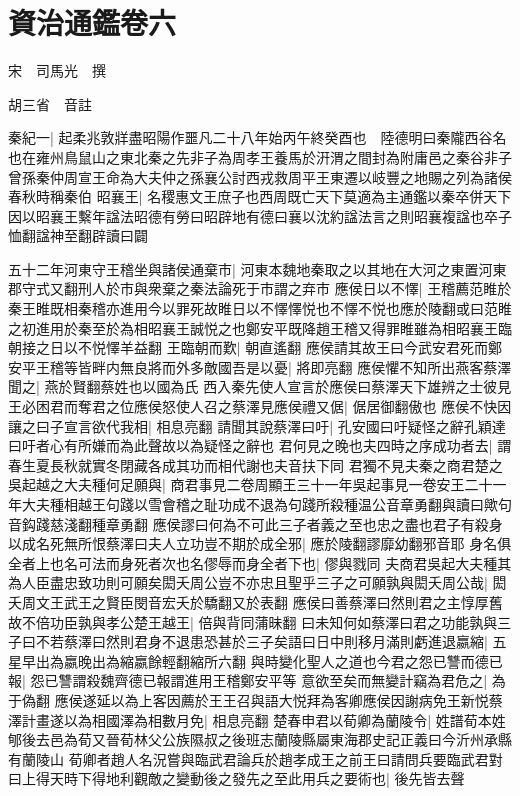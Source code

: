 \chapter{資治通鑑卷六}
宋　司馬光　撰

胡三省　音註

秦紀一|{
	起柔兆敦牂盡昭陽作噩凡二十八年始丙午終癸酉也　陸德明曰秦隴西谷名也在雍州鳥鼠山之東北秦之先非子為周孝王養馬於汧渭之間封為附庸邑之秦谷非子曾孫秦仲周宣王命為大夫仲之孫襄公討西戎救周平王東遷以岐豐之地賜之列為諸侯春秋時稱秦伯}
昭襄王|{
	名稷惠文王庶子也西周既亡天下莫適為主通鑑以秦卒併天下因以昭襄王繫年諡法昭德有勞曰昭辟地有德曰襄以沈約諡法言之則昭襄複諡也卒子恤翻諡神至翻辟讀曰闢}


五十二年河東守王稽坐與諸侯通棄市|{
	河東本魏地秦取之以其地在大河之東置河東郡守式又翻刑人於市與衆棄之秦法論死于市謂之弃市}
應侯日以不懌|{
	王稽薦范睢於秦王睢既相秦稽亦進用今以罪死故睢日以不懌懌悦也不懌不悦也應於陵翻或曰范睢之初進用於秦至於為相昭襄王誠悦之也鄭安平既降趙王稽又得罪睢雖為相昭襄王臨朝接之日以不悦懌羊益翻}
王臨朝而歎|{
	朝直遙翻}
應侯請其故王曰今武安君死而鄭安平王稽等皆畔内無良將而外多敵國吾是以憂|{
	將即亮翻}
應侯懼不知所出燕客蔡澤聞之|{
	燕於賢翻蔡姓也以國為氏}
西入秦先使人宣言於應侯曰蔡澤天下雄辨之士彼見王必困君而奪君之位應侯怒使人召之蔡澤見應侯禮又倨|{
	倨居御翻傲也}
應侯不快因讓之曰子宣言欲代我相|{
	相息亮翻}
請聞其說蔡澤曰吁|{
	孔安國曰吁疑怪之辭孔穎達曰吁者心有所嫌而為此聲故以為疑怪之辭也}
君何見之晚也夫四時之序成功者去|{
	謂春生夏長秋就實冬閉藏各成其功而相代謝也夫音扶下同}
君獨不見夫秦之商君楚之吳起越之大夫種何足願與|{
	商君事見二卷周顯王三十一年吳起事見一卷安王二十一年大夫種相越王句踐以雪會稽之耻功成不退為句踐所殺種温公音章勇翻與讀曰歟句音鈎踐慈淺翻種章勇翻}
應侯謬曰何為不可此三子者義之至也忠之盡也君子有殺身以成名死無所恨蔡澤曰夫人立功豈不期於成全邪|{
	應於陵翻謬靡幼翻邪音耶}
身名俱全者上也名可法而身死者次也名僇辱而身全者下也|{
	僇與戮同}
夫商君吳起大夫種其為人臣盡忠致功則可願矣閎夭周公豈不亦忠且聖乎三子之可願孰與閎夭周公哉|{
	閎夭周文王武王之賢臣閔音宏夭於驕翻又於表翻}
應侯曰善蔡澤曰然則君之主惇厚舊故不倍功臣孰與孝公楚王越王|{
	倍與背同蒲昧翻}
曰未知何如蔡澤曰君之功能孰與三子曰不若蔡澤曰然則君身不退患恐甚於三子矣語曰日中則移月滿則虧進退嬴縮|{
	五星早出為嬴晚出為縮嬴餘輕翻縮所六翻}
與時變化聖人之道也今君之怨已讐而德已報|{
	怨已讐謂殺魏齊德已報謂進用王稽鄭安平等}
意欲至矣而無變計竊為君危之|{
	為于偽翻}
應侯遂延以為上客因薦於王王召與語大悦拜為客卿應侯因謝病免王新悦蔡澤計畫遂以為相國澤為相數月免|{
	相息亮翻}
楚春申君以荀卿為蘭陵令|{
	姓譜荀本姓郇後去邑為荀又晉荀林父公族隰叔之後班志蘭陵縣屬東海郡史記正義曰今沂州承縣有蘭陵山}
荀卿者趙人名況嘗與臨武君論兵於趙孝成王之前王曰請問兵要臨武君對曰上得天時下得地利觀敵之變動後之發先之至此用兵之要術也|{
	後先皆去聲}
